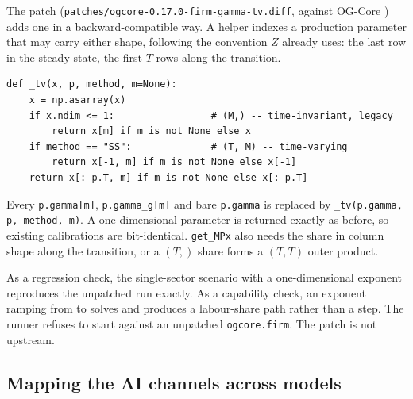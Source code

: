 The patch (\texttt{patches/ogcore-0.17.0-firm-gamma-tv.diff}, against OG-Core \genOgcoreVersion{}) adds one in a backward-compatible way. A helper indexes a production parameter that may carry either shape, following the convention $Z$ already uses: the last row in the steady state, the first $T$ rows along the transition.
\begin{verbatim}
def _tv(x, p, method, m=None):
    x = np.asarray(x)
    if x.ndim <= 1:                 # (M,) -- time-invariant, legacy
        return x[m] if m is not None else x
    if method == "SS":              # (T, M) -- time-varying
        return x[-1, m] if m is not None else x[-1]
    return x[: p.T, m] if m is not None else x[: p.T]
\end{verbatim}
Every \texttt{p.gamma[m]}, \texttt{p.gamma\_g[m]} and bare \texttt{p.gamma} is replaced by \texttt{\_tv(p.gamma, p, method, m)}. A one-dimensional parameter is returned exactly as before, so existing calibrations are bit-identical. \texttt{get\_MPx} also needs the share in column shape along the transition, or a $(T,)$ share forms a $(T,T)$ outer product.

As a regression check, the single-sector scenario with a one-dimensional exponent reproduces the unpatched run exactly. As a capability check, an exponent ramping from \genGammaBase{} to \genKorinekGammaTerminal{} solves and produces a labour-share path rather than a step. The runner refuses to start against an unpatched \texttt{ogcore.firm}. The patch is not upstream.

\subsection{Mapping the AI channels across models}
\label{app:channels}


